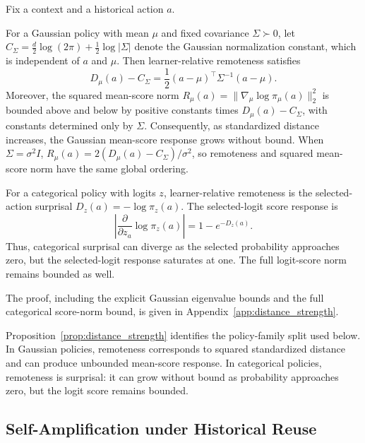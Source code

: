 \begin{proposition}
\label{prop:distance_strength}
Fix a context and a historical action \(a\).

For a Gaussian policy with mean \(\mu\) and fixed covariance
\(\Sigma\succ0\), let
\(C_\Sigma=\frac{d}{2}\log(2\pi)+\frac12\log|\Sigma|\) denote the
Gaussian normalization constant, which is independent of \(a\) and
\(\mu\). Then learner-relative remoteness satisfies
\begin{equation}
    D_\mu(a)-C_\Sigma
    =
    \frac12
    (a-\mu)^\top\Sigma^{-1}(a-\mu).
    \label{eq:gaussian_remoteness_mahalanobis}
\end{equation}
Moreover, the squared mean-score norm
\(R_\mu(a)=\|\nabla_\mu\log\pi_\mu(a)\|_2^2\) is bounded above and below
by positive constants times \(D_\mu(a)-C_\Sigma\), with constants
determined only by \(\Sigma\). Consequently, as standardized distance
increases, the Gaussian mean-score response grows without bound. When
\(\Sigma=\sigma^2I\), \(R_\mu(a)=2(D_\mu(a)-C_\Sigma)/\sigma^2\), so
remoteness and squared mean-score norm have the same global ordering.

For a categorical policy with logits \(z\), learner-relative remoteness is
the selected-action surprisal \(D_z(a)=-\log\pi_z(a)\). The selected-logit
score response is
\begin{equation}
    \left|
    \frac{\partial}{\partial z_a}
    \log \pi_z(a)
    \right|
    =
    1-e^{-D_z(a)}.
    \label{eq:categorical_selected_score}
\end{equation}
Thus, categorical surprisal can diverge as the selected probability
approaches zero, but the selected-logit response saturates at one. The
full logit-score norm remains bounded as well.
\end{proposition}

The proof, including the explicit Gaussian eigenvalue bounds and the full
categorical score-norm bound, is given in
Appendix~\ref{app:distance_strength}.

Proposition~\ref{prop:distance_strength} identifies the policy-family
split used below. In Gaussian policies, remoteness
corresponds to squared standardized distance and can produce unbounded
mean-score response. In categorical policies, remoteness is surprisal:
it can grow without bound as probability approaches zero, but the logit
score remains bounded.


\subsection{Self-Amplification under Historical Reuse}
\label{sec:self_amplification}


